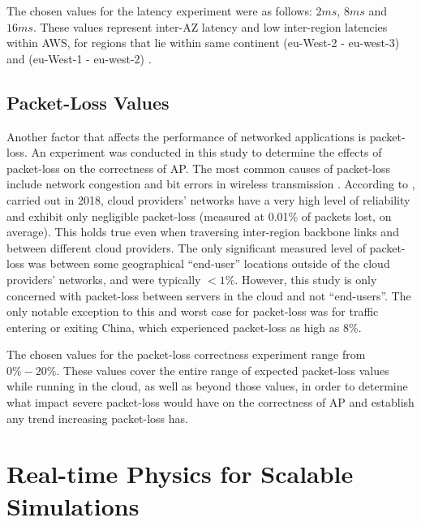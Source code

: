 The chosen values for the latency experiment were as follows: $2ms$, $8ms$ and $16ms$. These values represent inter-AZ latency and low inter-region latencies within AWS, for regions that lie within same continent (eu-West-2 - eu-west-3) and (eu-West-1 - eu-west-2) \cite{ThousandEyesCloudPerf2019}.

\subsection{Packet-Loss Values}
Another factor that affects the performance of networked applications is packet-loss. An experiment was conducted in this study to determine the effects of packet-loss on the correctness of AP. The most common causes of packet-loss include network congestion \cite{1998PacketLoss} and bit errors in wireless transmission \cite{2005PacketLoss}. According to \cite{ThousandEyesCloudPerf2018}, carried out in 2018, cloud providers' networks have a very high level of reliability and exhibit only negligible packet-loss (measured at 0.01\% of packets lost, on average). This holds true even when traversing inter-region backbone links and between different cloud providers. The only significant measured level of packet-loss was between some geographical ``end-user'' locations outside of the cloud providers' networks, and were typically $<1\%$. However, this study is only concerned with packet-loss between servers in the cloud and not ``end-users''. The only notable exception to this and worst case for packet-loss was for traffic entering or exiting China, which experienced packet-loss as high as $8\%$.

The chosen values for the packet-loss correctness experiment range from $0\%-20\%$. These values cover the entire range of expected packet-loss values while running in the cloud, as well as beyond those values, in order to determine what impact severe packet-loss would have on the correctness of AP and establish any trend increasing packet-loss has.

\section{Real-time Physics for Scalable Simulations}

